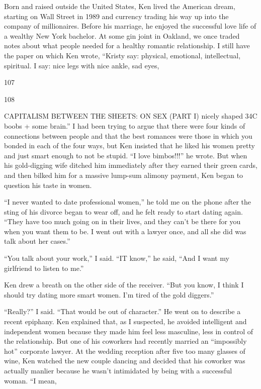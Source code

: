  \par 
Born and raised outside the United States, Ken lived the American dream, starting on Wall Street in 1989 and currency trading his way up into the company of millionaires. Before his marriage, he enjoyed the successful love life of a wealthy New York bachelor. At some gin joint in Oakland, we once traded notes about what people needed for a healthy romantic relationship. I still have the paper on which Ken wrote, “Kristy say: physical, emotional, intellectual, spiritual. I say: nice legs with nice ankle, sad eyes,
 \par 
107
 \par 
108
 \par 
CAPITALISM BETWEEN THE SHEETS: ON SEX (PART I) nicely shaped 34C boobs + some brain.” I had been trying to argue that there were four kinds of connections between people and that the best romances were those in which you bonded in each of the four ways, but Ken insisted that he liked his women pretty and just smart enough to not be stupid. “I love bimbos!!!” he wrote. But when his gold-digging wife ditched him immediately after they earned their green cards, and then bilked him for a massive lump-sum alimony payment, Ken began to question his taste in women.
 \par 
“I never wanted to date professional women,” he told me on the phone after the sting of his divorce began to wear off, and he felt ready to start dating again. “They have too much going on in their lives, and they can’t be there for you when you want them to be. I went out with a lawyer once, and all she did was talk about her cases.”
 \par 
“You talk about your work,” I said. “IT know,” he said, “And I want my girlfriend to listen to me.”
 \par 
Ken drew a breath on the other side of the receiver. “But you know, I think I should try dating more smart women. I'm tired of the gold diggers.”
 \par 
“Really?” I said. “That would be out of character.” He went on to describe a recent epiphany. Ken explained that, as I suspected, he avoided intelligent and independent women because they made him feel less masculine, less in control of the relationship. But one of his coworkers had recently married an “impossibly hot” corporate lawyer. At the wedding reception after five too many glasses of wine, Ken watched the new couple dancing and decided that his coworker was actually manlier because he wasn’t intimidated by being with a successful woman. “I mean,
